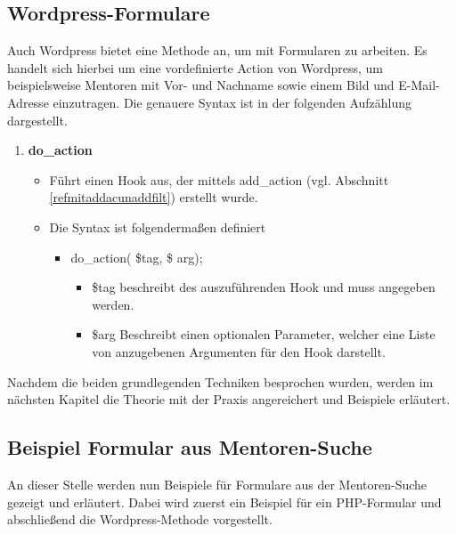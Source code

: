 \subsection{Wordpress-Formulare}\label{wpform}
Auch Wordpress bietet eine Methode an, um mit Formularen zu arbeiten. Es handelt sich hierbei um eine vordefinierte Action von Wordpress, um beispielsweise Mentoren mit Vor- und Nachname sowie einem Bild und E-Mail-Adresse einzutragen. \newline 
Die genauere Syntax ist in der folgenden Aufzählung dargestellt.
\begin{enumerate}
	\item \textbf{do\_action}
	\begin{itemize}
		\item Führt einen Hook aus, der mittels add\_action (vgl. Abschnitt \ref{refmitaddacunaddfilt}) erstellt wurde.
		\item Die Syntax ist folgendermaßen definiert
		\begin{itemize}
			\item do\_action( \$tag, \$ arg);
			\begin{itemize}
				\item \$tag beschreibt des auszuführenden Hook und muss angegeben werden.
				\item \$arg Beschreibt einen optionalen Parameter, welcher eine Liste von anzugebenen Argumenten für den Hook darstellt.
			\end{itemize}
		\end{itemize}
	\end{itemize}	
\end{enumerate}
Nachdem die beiden grundlegenden Techniken besprochen wurden, werden im nächsten Kapitel die Theorie mit der Praxis angereichert und Beispiele erläutert. 
\subsection{Beispiel Formular aus Mentoren-Suche}
An dieser Stelle werden nun Beispiele für Formulare aus der Mentoren-Suche gezeigt und erläutert.\newline
Dabei wird zuerst ein Beispiel für ein PHP-Formular und abschließend die Wordpress-Methode vorgestellt.
